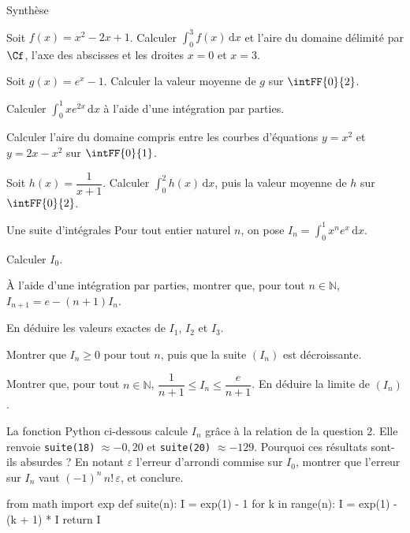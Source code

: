 \begin{exercice}[3]{Synthèse}
\begin{questions}
  \item Soit $f(x)=x^{2}-2x+1$. Calculer $\int_0^3f(x)\,\mathrm{d}x$ et l'aire du domaine délimité par $\Cf$, l'axe des abscisses et
    les droites $x=0$ et $x=3$.
  \item Soit $g(x)=e^{x}-1$. Calculer la valeur moyenne de $g$ sur $\intFF{0}{2}$.
  \item Calculer $\int_0^1xe^{2x}\,\mathrm{d}x$ à l'aide d'une intégration par parties.
  \item Calculer l'aire du domaine compris entre les courbes d'équations $y=x^{2}$ et $y=2x-x^{2}$ sur $\intFF{0}{1}$.
  \item Soit $h(x)=\dfrac{1}{x+1}$. Calculer $\int_0^2h(x)\,\mathrm{d}x$, puis la valeur moyenne de $h$ sur $\intFF{0}{2}$.
\end{questions}
\end{exercice}

\begin{exercice}[3]{Une suite d'intégrales}
Pour tout entier naturel $n$, on pose $I_n=\displaystyle\int_0^1x^{n}e^{x}\,\mathrm{d}x$.
\begin{questions}
  \item Calculer $I_0$.
  \item À l'aide d'une intégration par parties, montrer que, pour tout $n\in\mathbb{N}$, $I_{n+1}=e-(n+1)I_n$.
  \item En déduire les valeurs exactes de $I_1$, $I_2$ et $I_3$.
\end{questions}
\begin{questions}[resume]
  \item Montrer que $I_n\geq0$ pour tout $n$, puis que la suite $(I_n)$ est décroissante.
  \item Montrer que, pour tout $n\in\mathbb{N}$, $\dfrac{1}{n+1}\leq I_n\leq\dfrac{e}{n+1}$. En déduire la limite de $(I_n)$.
\end{questions}
\begin{questions}[resume]
  \item La fonction Python ci-dessous calcule $I_n$ grâce à la relation de la question 2. Elle renvoie \texttt{suite(18)}
    $\approx-0{,}20$ et \texttt{suite(20)} $\approx-129$. Pourquoi ces résultats sont-ils absurdes ? En notant $\varepsilon$
    l'erreur d'arrondi commise sur $I_0$, montrer que l'erreur sur $I_n$ vaut $(-1)^{n}\,n!\,\varepsilon$, et conclure.
\begin{python}
from math import exp
def suite(n):
    I = exp(1) - 1
    for k in range(n):
        I = exp(1) - (k + 1) * I
    return I
\end{python}
\end{questions}
\end{exercice}

